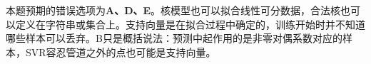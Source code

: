 本题预期的错误选项为\textbf{A、D、E}。核模型也可以拟合线性可分数据，合法核也可以定义在字符串或集合上。支持向量是在拟合过程中确定的，训练开始时并不知道哪些样本可以丢弃。B只是概括说法：预测中起作用的是非零对偶系数对应的样本，SVR容忍管道之外的点也可能是支持向量。
